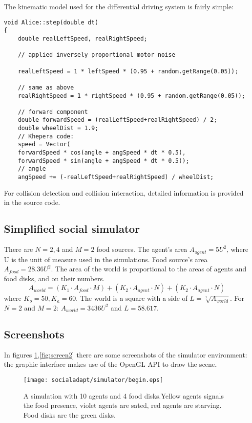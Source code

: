 The kinematic model used for the differential driving system is fairly simple:
\small{
\begin{lstlisting}
void Alice::step(double dt)
{
	double realLeftSpeed, realRightSpeed;
		
	// applied inversely proportional motor noise 

	realLeftSpeed = 1 * leftSpeed * (0.95 + random.getRange(0.05));

	// same as above
	realRightSpeed = 1 * rightSpeed * (0.95 + random.getRange(0.05));

	// forward component
	double forwardSpeed = (realLeftSpeed+realRightSpeed) / 2;
	double wheelDist = 1.9;
	// Khepera code:
	speed = Vector(
	forwardSpeed * cos(angle + angSpeed * dt * 0.5),
	forwardSpeed * sin(angle + angSpeed * dt * 0.5));
	// angle
	angSpeed += (-realLeftSpeed+realRightSpeed) / wheelDist;	
\end{lstlisting}
}

For collision detection and collision interaction, detailed information
is provided in the source code.

\subsection{Simplified social simulator \label{Appendix:simplesocialsim}}

There are $N=2,4$ and $M=2$ food sources.
The agent's area $A_{agent}=5 U^{2}$, where U is the unit of measure used in the simulations.
Food source's area $A_{food}=28.36 U^2$.
The area of the world is proportional to the areas of agents and food disks, and on their numbers.
\begin{equation}
A_{world}=(K_{1} \cdot A_{food} \cdot M) + (K_{2} \cdot A_{agent} \cdot N) + (K_{2} \cdot A_{agent} \cdot N)
\end{equation}
where $K_{o}=50,K_{a}=60$. The world is a square with a side of $L=\sqrt[2]{A_{world}}$.
For $N=2$ and $M=2$: $A_{world}=3436 U^2$ and $L=58.617$.

\subsection{Screenshots}
In figures \ref{fig:screen1},\ref{fig:screen2} there are some screenshots of
the simulator environment: the graphic interface makes use of the OpenGL API
to draw the scene.

\begin{figure}[htb]
\begin{centering}
\texttt{[image: socialadapt/simulator/begin.eps]}
\small{
\caption[Software simulation in Enki A]{A simulation with 10 agents and 4 food disks.Yellow agents signals the
food presence, violet agents are sated, red agents are starving.
Food disks are the green disks. \label{fig:screen1}}
}
\end{centering}
\end{figure}

